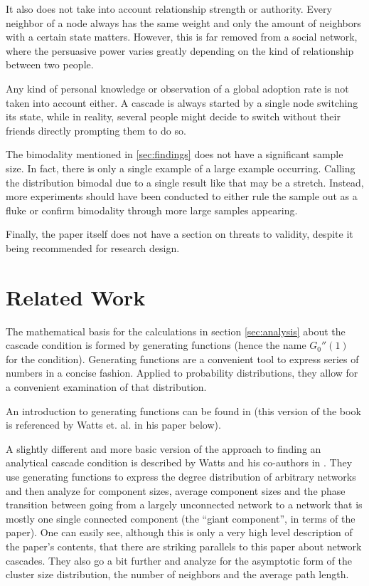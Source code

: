 \documentclass{sig-alternate-05-2015}
\begin{document}
It also does not take into account relationship strength or authority. Every neighbor of a node always has the same weight and only the amount of neighbors with a certain state matters. However, this is far removed from a social network, where the persuasive power varies greatly depending on the kind of relationship between two people.

Any kind of personal knowledge or observation of a global adoption rate is not taken into account either. A cascade is always started by a single node switching its state, while in reality, several people might decide to switch without their friends directly prompting them to do so.

The bimodality mentioned in \ref{sec:findings} does not have a significant sample size. In fact, there is only a single example of a large example occurring. Calling the distribution bimodal due to a single result like that may be a stretch. Instead, more experiments should have been conducted to either rule the sample out as a fluke or confirm bimodality through more large samples appearing.

Finally, the paper itself does not have a section on threats to validity, despite it being recommended for research design\cite{yodawg}.


\section{Related Work}\label{sec:related-work}

The mathematical basis for the calculations in section \ref{sec:analysis} about the cascade condition is formed by generating functions (hence the name $G_0''(1)$ for the condition). Generating functions are a convenient tool to express series of numbers in a concise fashion. Applied to probability distributions, they allow for a convenient examination of that distribution.

An introduction to generating functions can be found in \cite{wilf1994generatingfunctionology} (this version of the book is referenced by Watts et. al. in his paper below).

A slightly different and more basic version of the approach to finding an analytical cascade condition is described by Watts and his co-authors in \cite{newman2001random}. They use generating functions to express the degree distribution of arbitrary networks and then analyze for component sizes, average component sizes and the phase transition between going from a largely unconnected network to a network that is mostly one single connected component (the ``giant component'', in terms of the paper). One can easily see, although this is only a very high level description of the paper's contents, that there are striking parallels to this paper about network cascades. They also go a bit further and analyze for the asymptotic form of the cluster size distribution, the number of neighbors and the average path length.
\end{document}
